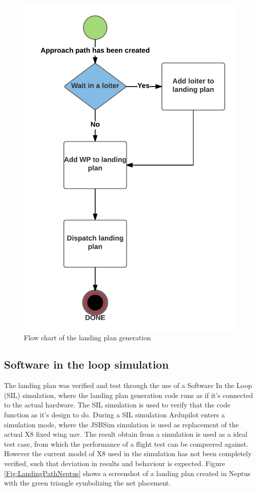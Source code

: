 \begin{figure}[H]
\centering
\includegraphics[scale=0.8]{figs/LandingPath.png}
\caption{Flow chart of the landing plan generation}
\label{Fig:FlowChartLanding}
\end{figure}
\subsection{Software in the loop simulation}
The landing plan was verified and test through the use of a Software In the Loop (SIL) simulation, where the landing plan generation code runs as if it's connected to the actual hardware. The SIL simulation is used to verify that the code function as it's design to do. During a SIL simulation Ardupilot enters a simulation mode, where the JSBSim simulation is used as replacement of the actual X8 fixed wing \gls{uav}. The result obtain from a simulation is used as a ideal test case, from which the performance of a flight test can be compeered against. However the current model of X8 used in the simulation has not been completely verified, such that deviation in results and behaviour is expected. Figure \ref{Fig:LandingPathNeptus} shows a screenshot of a landing plan created in Neptus with the green triangle symbolizing the net placement. 


